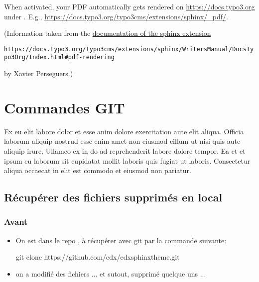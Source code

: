 \documentclass[a4paper,10pt,french]{sphinxmanual}
\begin{document}
When activated, your PDF automatically gets rendered on \url{https://docs.typo3.org} under
. E.g.,
\url{https://docs.typo3.org/typo3cms/extensions/sphinx/\_pdf/}.

(Information taken from the \href{https://docs.typo3.org/typo3cms/extensions/sphinx/WritersManual/DocsTypo3Org/Index.html\#pdf-rendering}{documentation of the sphinx extension}%
\begin{footnote}[4]\sphinxAtStartFootnote
\nolinkurl{https://docs.typo3.org/typo3cms/extensions/sphinx/WritersManual/DocsTypo3Org/Index.html\#pdf-rendering}
%
\end{footnote} by Xavier Perseguers.)


\section{Commandes GIT}
\label{\detokenize{docs/tuts/autocad-tut01:commandes-git}}\label{\detokenize{docs/tuts/autocad-tut01:id1}}
Ex eu elit labore dolor et esse anim dolore exercitation aute elit aliqua. Officia laborum aliquip nostrud esse enim amet non eiusmod cillum ut nisi quis aute aliquip irure. Ullamco ex in do ad reprehenderit labore dolore tempor. Ea et et ipsum eu laborum sit cupidatat mollit laboris quis fugiat ut laboris. Consectetur aliqua occaecat in elit est commodo et eiusmod non pariatur.


\subsection{Récupérer des fichiers supprimés en local}
\label{\detokenize{docs/tuts/autocad-tut01:recuperer-des-fichiers-supprimes-en-local}}

\subsubsection{Avant}
\label{\detokenize{docs/tuts/autocad-tut01:avant}}\begin{itemize}
\item {} 
On est dans le repo , à récupérer avec git par la commande suivante:

\begin{sphinxVerbatim}[commandchars=\\\{\}]
\PYGZdl{} git clone https://github.com/edx/edx\PYGZhy{}sphinx\PYGZhy{}theme.git
\end{sphinxVerbatim}

\item {} 
on a modifié des fichiers ... et sutout, supprimé quelque uns ...

\end{itemize}
\end{document}
